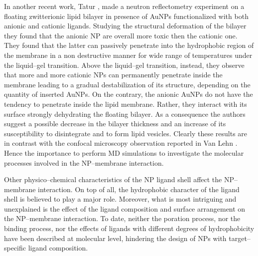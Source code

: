 In another recent work, Tatur \etal \cite{Maccarini2013}, made a neutron reflectometry experiment on a floating zwitterionic lipid bilayer in presence of \acp{AuNP} functionalized with both anionic and cationic ligands. Studying the structural deformation of the bilayer they found that the anionic \acs{NP} are overall more toxic then the cationic one. They found that the latter can passively penetrate into the hydrophobic region of the membrane in a non destructive manner for wide range of temperatures under the liquid--gel transition. Above the liquid--gel transition, instead, they observe that more and more cationic \acp{NP} can permanently penetrate inside the membrane leading to a gradual destabilization of its structure, depending on the quantity of inserted \acp{AuNP}. On the contrary, the anionic \acp{AuNP} do not have the tendency to penetrate inside the lipid membrane. Rather, they interact with its surface strongly dehydrating the floating bilayer. As a consequence the authors suggest a possible decrease in the bilayer thickness and an increase of its susceptibility to disintegrate and to form lipid vesicles. Clearly these results are in contrast with the confocal microscopy observation reported in Van Lehn \etal \cite{VanLehn2013}. Hence the importance to perform \ac{MD} simulations to investigate the molecular processes involved in the \ac{NP}--membrane interaction.

Other physico--chemical characteristics of the \ac{NP} ligand shell affect the \ac{NP}--membrane interaction. On top of all, the hydrophobic character of the ligand shell is believed to play a major role. Moreover, what is most intriguing and unexplained is the effect of the ligand composition and surface arrangement on the \ac{NP}--membrane interaction. To date, neither the poration process, nor the binding process, nor the effects of ligands with different degrees of hydrophobicity have been described at molecular level, hindering the design of \acp{NP} with target--specific ligand composition.


